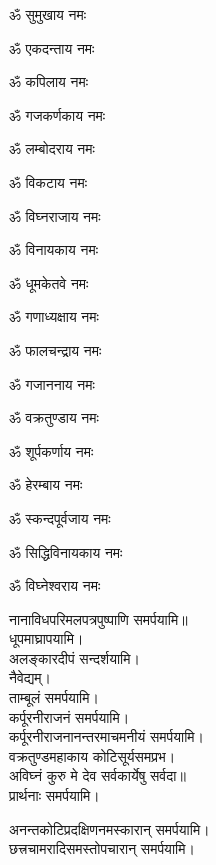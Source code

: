 \begin{enumerate}%
\begin{minipage}{0.475\linewidth}
\item ॐ सुमुखाय नमः
\item ॐ एकदन्ताय नमः
\item ॐ कपिलाय नमः
\item ॐ गजकर्णकाय नमः
\item ॐ लम्बोदराय नमः
\item ॐ विकटाय नमः
\item ॐ विघ्नराजाय नमः
\item ॐ विनायकाय नमः
\item ॐ धूमकेतवे नमः
  \end{minipage}
  \begin{minipage}{0.525\linewidth}
\item ॐ गणाध्यक्षाय नमः
\item ॐ फालचन्द्राय नमः
\item ॐ गजाननाय नमः
\item ॐ वक्रतुण्डाय नमः
\item ॐ शूर्पकर्णाय नमः
\item ॐ हेरम्बाय नमः
\item ॐ स्कन्दपूर्वजाय नमः
\item ॐ सिद्धिविनायकाय नमः
\item ॐ विघ्नेश्वराय नमः
  \end{minipage}
\end{enumerate}
नानाविधपरिमलपत्रपुष्पाणि समर्पयामि॥\\
धूपमाघ्रापयामि।\\
अलङ्कारदीपं सन्दर्शयामि।\\
नैवेद्यम्।\\
ताम्बूलं समर्पयामि।\\
कर्पूरनीराजनं समर्पयामि।\\
कर्पूरनीराजनानन्तरमाचमनीयं समर्पयामि।\\
{वक्रतुण्डमहाकाय कोटिसूर्यसमप्रभ।}\\
{अविघ्नं कुरु मे देव सर्वकार्येषु सर्वदा॥}\\
प्रार्थनाः समर्पयामि।

अनन्तकोटिप्रदक्षिणनमस्कारान् समर्पयामि।\\
छत्त्रचामरादिसमस्तोपचारान् समर्पयामि।\\


